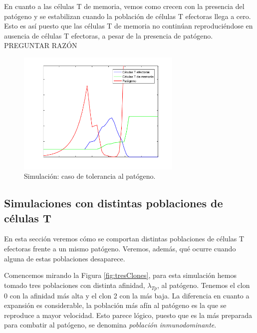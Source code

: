 En cuanto a las células T de memoria, vemos como crecen con la presencia del patógeno y se estabilizan cuando la población de células T efectoras llega a cero. Esto es así puesto que las células T de memoria no continúan reproduciéndose en ausencia de células T efectoras, a pesar de la presencia de patógeno. PREGUNTAR RAZÓN 

\begin{figure}[t]
	\centering
	\includegraphics[width=0.7\textwidth]{Imagenes/Simulaciones/tolerance}
	\caption{Simulación: caso de tolerancia al patógeno.}
	\label{fig:tolerance}
\end{figure}

\subsection{Simulaciones con distintas poblaciones de células T}

En esta sección veremos cómo se comportan distintas poblaciones de células T efectoras frente a un mismo patógeno. Veremos, además, qué ocurre cuando alguna de estas poblaciones desaparece. 

Comencemos mirando la Figura \ref{fig:tresClones}, para esta simulación hemos tomado tres poblaciones con distinta afinidad, $\lambda_{Tp}$, al patógeno. Tenemos el clon 0 con la afinidad más alta y el clon 2 con la más baja. La diferencia en cuanto a expansión es considerable, la población más afín al patógeno es la que se reproduce a mayor velocidad. Esto parece lógico, puesto que es la más preparada para combatir al patógeno, se denomina \textit{población inmunodominante}.

